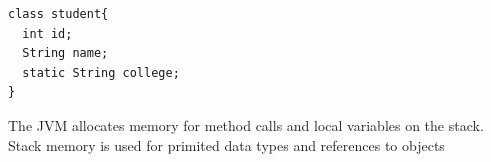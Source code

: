 \documentclass[11pt,letterpaper]{article}
\begin{document}
\begin{verbatim}
class student{
  int id;
  String name;
  static String college;
}
\end{verbatim}
The JVM allocates memory for method calls and local variables on the stack.\\
Stack memory is used for primited data types and references to objects\\
\end{document}
